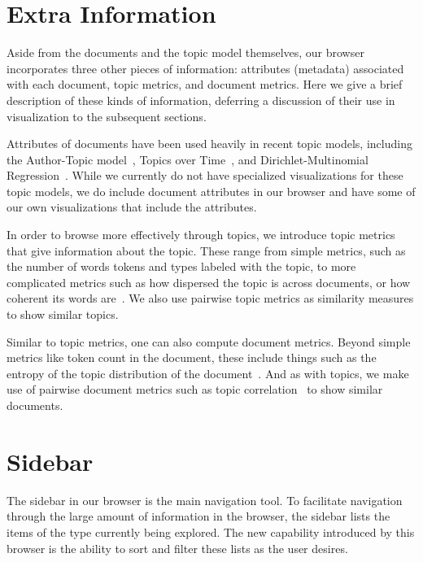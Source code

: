 \documentclass{article}
\begin{document}
\section{Extra Information}

Aside from the documents and the topic model themselves, our browser
incorporates three other pieces of information: attributes (metadata)
associated with each document, topic metrics, and document metrics.  Here we
give a brief description of these kinds of information, deferring a discussion
of their use in visualization to the subsequent sections.

Attributes of documents have been used heavily in recent topic models,
including the Author-Topic model~\cite{rosen-zvi-2004-author-topic-model},
Topics over Time~\cite{wang-2006-topics-over-time}, and Dirichlet-Multinomial
Regression~\cite{mimno-2008-topic-models-with-arbitrary-features-dmr}.  While
we currently do not have specialized visualizations for these topic models, we
do include document attributes in our browser and have some of our own 
visualizations that include the attributes.

In order to browse more effectively through topics, we introduce topic metrics
that give information about the topic.  These range from simple metrics, such
as the number of words tokens and types labeled with the topic, to more
complicated metrics such as how dispersed the topic is across documents, or how
coherent its words
are~\cite{newman-2010-automatic-evaluation-of-topic-coherence}.  We also use
pairwise topic metrics as similarity measures to show similar topics.

Similar to topic metrics, one can also compute document metrics.  Beyond simple
metrics like token count in the document, these include things such as the
entropy of the topic distribution of the
document~\cite{misra-2008-lda-to-find-semantically-incoherent-documents}.  And
as with topics, we make use of pairwise document metrics such as topic
correlation~\cite{blei-2009-topic-models} to show similar documents.

\section{Sidebar}

The sidebar in our browser is the main navigation tool.  To facilitate
navigation through the large amount of information in the browser, the sidebar
lists the items of the type currently being explored.  The new capability
introduced by this browser is the ability to sort and filter these lists as the
user desires.
\end{document}
